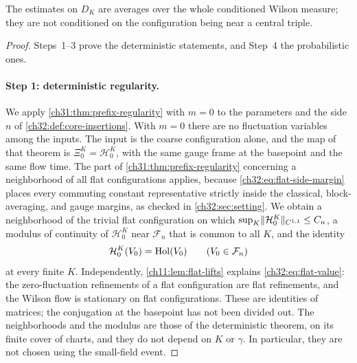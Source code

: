 The estimates on $D_K$ are averages over the whole conditioned Wilson measure; they are not conditioned on the configuration being near a central triple.

\begin{proof}
Steps~1--3 prove the deterministic statements, and Step~4 the probabilistic ones.

\paragraph{Step 1: deterministic regularity.}
We apply \cref{ch31:thm:prefix-regularity} with $m=0$ to the parameters and the side $n$ of \cref{ch32:def:core-insertions}. With $m=0$ there are no fluctuation variables among the inputs. The input is the coarse configuration alone, and the map of that theorem is $\Xi_0^K=\mathcal H^K_0$, with the same gauge frame at the basepoint and the same flow time. The part of \cref{ch31:thm:prefix-regularity} concerning a neighborhood of all flat configurations applies, because \eqref{ch32:eq:flat-side-margin} places every commuting constant representative strictly inside the classical, block-averaging, and gauge margins, as checked in \cref{ch32:sec:setting}. We obtain a neighborhood of the trivial flat configuration on which $\sup_K\lVert \mathcal H^K_0\rVert_{C^{1,1}}\le C_n$, a modulus of continuity of $\mathcal H^K_0$ near $\mathcal F_n$ that is common to all $K$, and the identity
\begin{equation}\label{ch32:eq:flat-value}
 \mathcal H^K_0(V_0)=\operatorname{Hol}(V_0)\qquad(V_0\in\mathcal F_n)
\end{equation}
at every finite $K$. Independently, \cref{ch11:lem:flat-lifts} explains \eqref{ch32:eq:flat-value}: the zero-fluctuation refinements of a flat configuration are flat refinements, and the Wilson flow is stationary on flat configurations. These are identities of matrices; the conjugation at the basepoint has not been divided out. The neighborhoods and the modulus are those of the deterministic theorem, on its finite cover of charts, and they do not depend on $K$ or $\gamma$. In particular, they are not chosen using the small-field event.


\end{proof}
